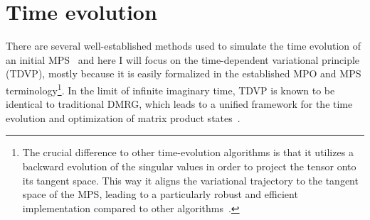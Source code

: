 \section{Time evolution}
\label{sec:time_evolution}
%
%
There are several well-established methods used to simulate the time evolution of an initial MPS~\cite{Paeckel2019} and here I will focus on the time-dependent variational principle (TDVP), mostly because it is easily formalized in the established MPO and MPS terminology\footnote{The crucial difference to other time-evolution algorithms is that it utilizes a backward evolution of the singular values in order to project the tensor onto its tangent space.
This way it aligns the variational trajectory to the tangent space of the MPS, leading to a particularly robust and efficient implementation compared to other algorithms~\cite{Haegeman2011}.}.
In the limit of infinite imaginary time, TDVP is known to be identical to traditional DMRG, which leads to a unified framework for the time evolution and optimization of matrix product states~\cite{Haegeman2016}.

